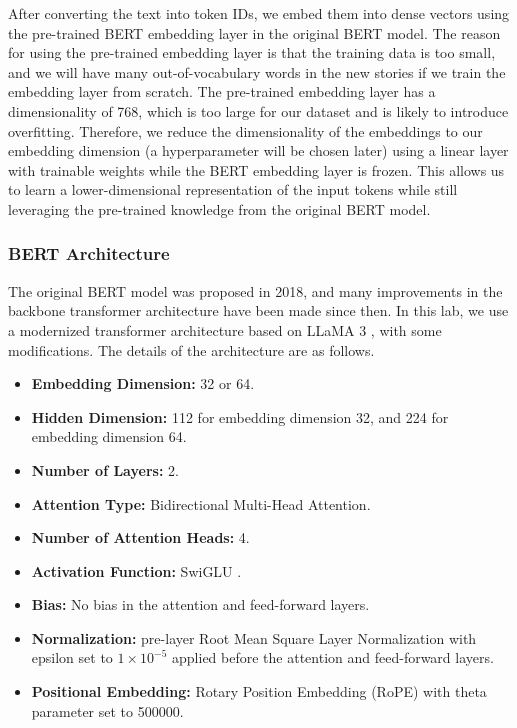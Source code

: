 \documentclass[10pt,letterpaper]{article}
\begin{document}
After converting the text into token IDs, we embed them into dense vectors using the pre-trained BERT embedding layer in the original BERT model. The reason for using the pre-trained embedding layer is that the training data is too small, and we will have many out-of-vocabulary words in the new stories if we train the embedding layer from scratch. The pre-trained embedding layer has a dimensionality of 768, which is too large for our dataset and is likely to introduce overfitting. Therefore, we reduce the dimensionality of the embeddings to our embedding dimension (a hyperparameter will be chosen later) using a linear layer with trainable weights while the BERT embedding layer is frozen. This allows us to learn a lower-dimensional representation of the input tokens while still leveraging the pre-trained knowledge from the original BERT model.

\subsubsection{BERT Architecture}
The original BERT model was proposed in 2018, and many improvements in the backbone transformer architecture have been made since then. In this lab, we use a modernized transformer architecture based on LLaMA 3 \cite{grattafiori2024llama}, with some modifications. The details of the architecture are as follows.

\begin{itemize}
    \item \textbf{Embedding Dimension:} 32 or 64.
    \item \textbf{Hidden Dimension:} 112 for embedding dimension 32, and 224 for embedding dimension 64.
    \item \textbf{Number of Layers:} 2.
    \item \textbf{Attention Type:} Bidirectional Multi-Head Attention.
    \item \textbf{Number of Attention Heads:} 4.
    \item \textbf{Activation Function:} SwiGLU \cite{shazeer2020glu}.
    \item \textbf{Bias:} No bias in the attention and feed-forward layers.
    \item \textbf{Normalization:} pre-layer Root Mean Square Layer Normalization \cite{zhang2019root} with epsilon set to \(1 \times 10^{-5}\) applied before the attention and feed-forward layers.
    \item \textbf{Positional Embedding:} Rotary Position Embedding (RoPE) \cite{su2024roformer} with theta parameter set to 500000.
\end{itemize}
\end{document}
